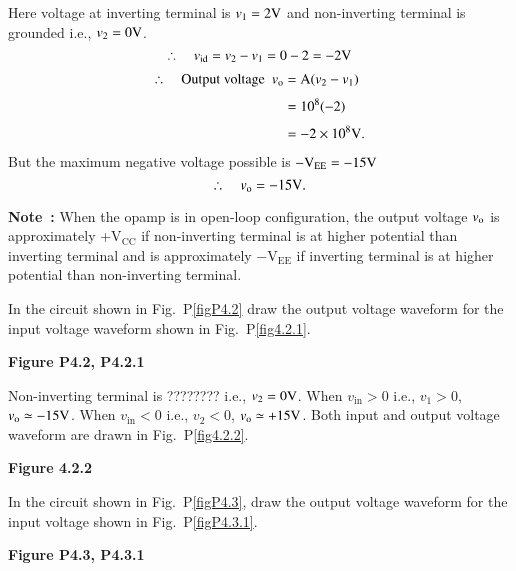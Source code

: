 \begin{solution}
Here voltage at inverting terminal is $v_{1}=2\textrm{V}$ and non-inverting terminal is grounded i.e., $v_{2}=0\textrm{V}$.
$$
\therefore\quad v_{\operatorname{id}}=v_{2}-v_{1}=0-2=-2\textrm{V}
$$
\begin{align*}
\therefore\quad \text{Output voltage ~} v_{\textrm{o}} &= \textrm{A} (v_{2}-v_{1})\\[3pt]
                                             &= 10^{8}(-2)\\[3pt]
                                             &= -2\times 10^{8}\textrm{V}.
\end{align*}
But the maximum negative voltage possible is $-\textrm{V}_{\text{EE}}=-15\textrm{V}$
$$
\therefore\quad v_{\textrm{o}}=-15\textrm{V}.
$$
\end{solution}

\noindent
{\bf Note~:} When the opamp is in open-loop configuration, the output voltage $v_{\textrm{o}}$ is approximately +V$_{\text{CC}}$ if non-inverting terminal is at higher potential than inverting terminal and is approximately $-$V$_{\text{EE}}$ if inverting terminal is at higher potential than non-inverting terminal.

\begin{problem}\label{prob4.2}
In the circuit shown in Fig.~P\ref{figP4.2} draw the output voltage waveform for the input voltage waveform shown in Fig.~P\ref{fig4.2.1}.
\begin{center}
{\bf Figure P4.2, P4.2.1}
\end{center}
\end{problem}

\begin{solution}
Non-inverting terminal is ???????? i.e., $v_{2}=0\textrm{V}$. When $v_{\text{in}}>0$ i.e., $v_{1}>0$, $v_{\textrm{o}}\simeq - 15\textrm{V}$. When $v_{\text{in}}<0$ i.e., $v_{2}<0$, $v_{\textrm{o}}\simeq +15\textrm{V}$. Both input and output voltage waveform are drawn in Fig.~P\ref{fig4.2.2}.
\begin{center}
{\bf Figure 4.2.2}
\end{center}
\end{solution}

\begin{problem}\label{prop4.3}
In the circuit shown in Fig.~P\ref{figP4.3}, draw the output voltage waveform for the input voltage shown in Fig.~P\ref{figP4.3.1}.
\begin{center}
{\bf Figure P4.3, P4.3.1}
\end{center}
\end{problem}

